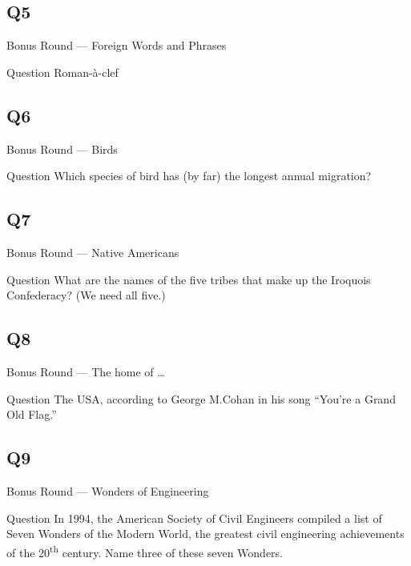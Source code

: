 \documentclass[11pt]{beamer}
\begin{document}
\subsection*{Q5}
\begin{frame}[t]{Bonus Round --- Foreign Words and Phrases}
    \vspace{-0.5em}
    \begin{block}{Question}
        Roman-à-clef
    \end{block}
\end{frame}
\subsection*{Q6}
\begin{frame}[t]{Bonus Round --- Birds}
    \vspace{-0.5em}
    \begin{block}{Question}
        Which species of bird has (by far) the longest annual migration?
    \end{block}
\end{frame}
\subsection*{Q7}
\begin{frame}[t]{Bonus Round --- Native Americans}
    \vspace{-0.5em}
    \begin{block}{Question}
        What are the names of the five tribes that make up the Iroquois Confederacy?  (We need all five.)
    \end{block}
\end{frame}
\subsection*{Q8}
\begin{frame}[t]{Bonus Round --- The home of \ldots{}}
    \vspace{-0.5em}
    \begin{block}{Question}
        The USA, according to George M.\@ Cohan in his song ``You're a Grand Old Flag.''
    \end{block}
\end{frame}
\subsection*{Q9}
\begin{frame}[t]{Bonus Round --- Wonders of Engineering}
    \vspace{-0.5em}
    \begin{block}{Question}
        In 1994, the American Society of Civil Engineers compiled a list of Seven Wonders of the Modern World, the greatest civil engineering achievements of the 20\textsuperscript{th} century. Name three of these seven Wonders.
    \end{block}
\end{frame}
\end{document}
